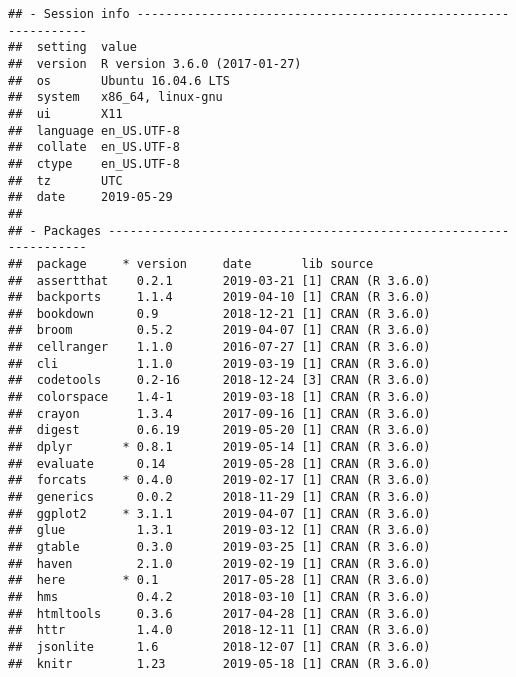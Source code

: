 \documentclass[]{book}
\begin{document}
\begin{verbatim}
## - Session info ---------------------------------------------------------------
##  setting  value                       
##  version  R version 3.6.0 (2017-01-27)
##  os       Ubuntu 16.04.6 LTS          
##  system   x86_64, linux-gnu           
##  ui       X11                         
##  language en_US.UTF-8                 
##  collate  en_US.UTF-8                 
##  ctype    en_US.UTF-8                 
##  tz       UTC                         
##  date     2019-05-29                  
## 
## - Packages -------------------------------------------------------------------
##  package     * version     date       lib source                           
##  assertthat    0.2.1       2019-03-21 [1] CRAN (R 3.6.0)                   
##  backports     1.1.4       2019-04-10 [1] CRAN (R 3.6.0)                   
##  bookdown      0.9         2018-12-21 [1] CRAN (R 3.6.0)                   
##  broom         0.5.2       2019-04-07 [1] CRAN (R 3.6.0)                   
##  cellranger    1.1.0       2016-07-27 [1] CRAN (R 3.6.0)                   
##  cli           1.1.0       2019-03-19 [1] CRAN (R 3.6.0)                   
##  codetools     0.2-16      2018-12-24 [3] CRAN (R 3.6.0)                   
##  colorspace    1.4-1       2019-03-18 [1] CRAN (R 3.6.0)                   
##  crayon        1.3.4       2017-09-16 [1] CRAN (R 3.6.0)                   
##  digest        0.6.19      2019-05-20 [1] CRAN (R 3.6.0)                   
##  dplyr       * 0.8.1       2019-05-14 [1] CRAN (R 3.6.0)                   
##  evaluate      0.14        2019-05-28 [1] CRAN (R 3.6.0)                   
##  forcats     * 0.4.0       2019-02-17 [1] CRAN (R 3.6.0)                   
##  generics      0.0.2       2018-11-29 [1] CRAN (R 3.6.0)                   
##  ggplot2     * 3.1.1       2019-04-07 [1] CRAN (R 3.6.0)                   
##  glue          1.3.1       2019-03-12 [1] CRAN (R 3.6.0)                   
##  gtable        0.3.0       2019-03-25 [1] CRAN (R 3.6.0)                   
##  haven         2.1.0       2019-02-19 [1] CRAN (R 3.6.0)                   
##  here        * 0.1         2017-05-28 [1] CRAN (R 3.6.0)                   
##  hms           0.4.2       2018-03-10 [1] CRAN (R 3.6.0)                   
##  htmltools     0.3.6       2017-04-28 [1] CRAN (R 3.6.0)                   
##  httr          1.4.0       2018-12-11 [1] CRAN (R 3.6.0)                   
##  jsonlite      1.6         2018-12-07 [1] CRAN (R 3.6.0)                   
##  knitr         1.23        2019-05-18 [1] CRAN (R 3.6.0)                   

\end{verbatim}
\end{document}
